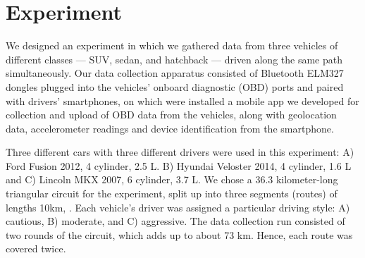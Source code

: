 \section{Experiment}

We designed an experiment in which we gathered data from three vehicles of different classes --- SUV, sedan, and hatchback --- driven along the same path simultaneously. Our data collection apparatus consisted of Bluetooth ELM327 dongles plugged into the vehicles' onboard diagnostic (OBD) ports and paired with drivers' smartphones, on which were installed a mobile app we developed for collection and upload of OBD data from the vehicles, along with geolocation data, accelerometer readings and device identification from the smartphone.

Three different cars with three different drivers were used in this experiment: A) Ford Fusion 2012, 4 cylinder, 2.5 L. B) Hyundai Veloster 2014, 4 cylinder, 1.6 L and C) Lincoln MKX 2007, 6 cylinder, 3.7 L. We chose a 36.3 kilometer-long triangular circuit for the experiment, split up into three segments (routes) of lengths 10km, . Each vehicle's driver was assigned a particular driving style: A) cautious, B) moderate, and C) aggressive. The data collection run consisted of two rounds of the circuit, which adds up to about 73 km. Hence, each route was covered twice.
